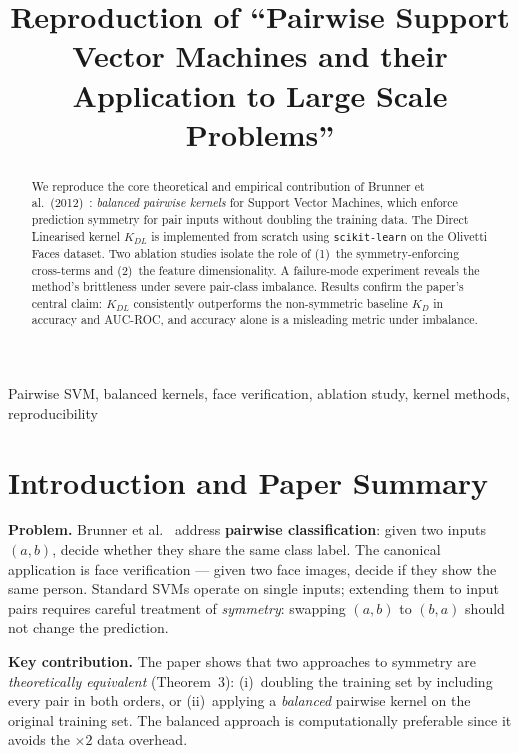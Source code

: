 \documentclass[conference]{IEEEtran}
\title{Reproduction of ``Pairwise Support Vector Machines and their
Application to Large Scale Problems''}
\author{%
  \IEEEauthorblockN{Eranki Sai Vikas}
  \IEEEauthorblockA{Roll No: 230121 \\
    Advanced Machine Learning --- Mid-Semester Examination Part B \\
    Rishihood University, Sonipat, India \\
    \texttt{eranki.v23csai@nst.rishihood.edu.in}}
}
\begin{document}
\maketitle

\begin{abstract}
We reproduce the core theoretical and empirical contribution of Brunner
et al.\ (2012)~\cite{brunner2012}: \emph{balanced pairwise kernels} for
Support Vector Machines, which enforce prediction symmetry for pair inputs
without doubling the training data. The Direct Linearised kernel $K_{DL}$
is implemented from scratch using \texttt{scikit-learn} on the Olivetti
Faces dataset. Two ablation studies isolate the role of (1)~the
symmetry-enforcing cross-terms and (2)~the feature dimensionality. A
failure-mode experiment reveals the method's brittleness under severe
pair-class imbalance. Results confirm the paper's central claim:
$K_{DL}$ consistently outperforms the non-symmetric baseline $K_D$ in
accuracy and AUC-ROC, and accuracy alone is a misleading metric under
imbalance.
\end{abstract}

\begin{IEEEkeywords}
Pairwise SVM, balanced kernels, face verification, ablation study,
kernel methods, reproducibility
\end{IEEEkeywords}

\section{Introduction and Paper Summary}

\textbf{Problem.}
Brunner et al.~\cite{brunner2012} address \textbf{pairwise classification}:
given two inputs $(a,b)$, decide whether they share the same class label.
The canonical application is face verification --- given two face images,
decide if they show the same person. Standard SVMs operate on single
inputs; extending them to input pairs requires careful treatment of
\emph{symmetry}: swapping $(a,b)$ to $(b,a)$ should not change the
prediction.

\textbf{Key contribution.}
The paper shows that two approaches to symmetry are \emph{theoretically
equivalent} (Theorem~3): (i)~doubling the training set by including every
pair in both orders, or (ii)~applying a \emph{balanced} pairwise kernel
on the original training set. The balanced approach is computationally
preferable since it avoids the $\times2$ data overhead.
\end{document}
